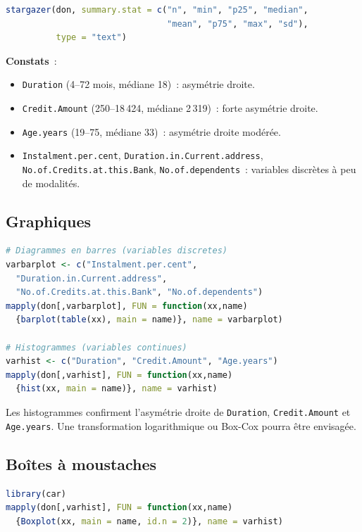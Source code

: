 \documentclass[a4paper,11pt]{article}
\theoremstyle{definition}
\theoremstyle{remark}
\begin{document}
\begin{lstlisting}[language=R]
stargazer(don, summary.stat = c("n", "min", "p25", "median",
                                "mean", "p75", "max", "sd"),
          type = "text")
\end{lstlisting}

\textbf{Constats}~:
\begin{itemize}
  \item \texttt{Duration} (4--72 mois, médiane 18)~: asymétrie droite.
  \item \texttt{Credit.Amount} (250--18\,424, médiane 2\,319)~:
    forte asymétrie droite.
  \item \texttt{Age.years} (19--75, médiane 33)~: asymétrie droite
    modérée.
  \item \texttt{Instalment.per.cent}, \texttt{Duration.in.Current.address},
    \texttt{No.of.Credits.at.this.Bank}, \texttt{No.of.dependents}~:
    variables discrètes à peu de modalités.
\end{itemize}

\subsection{Graphiques}

\begin{lstlisting}[language=R]
# Diagrammes en barres (variables discretes)
varbarplot <- c("Instalment.per.cent",
  "Duration.in.Current.address",
  "No.of.Credits.at.this.Bank", "No.of.dependents")
mapply(don[,varbarplot], FUN = function(xx,name)
  {barplot(table(xx), main = name)}, name = varbarplot)

# Histogrammes (variables continues)
varhist <- c("Duration", "Credit.Amount", "Age.years")
mapply(don[,varhist], FUN = function(xx,name)
  {hist(xx, main = name)}, name = varhist)
\end{lstlisting}

Les histogrammes confirment l'asymétrie droite de \texttt{Duration},
\texttt{Credit.Amount} et \texttt{Age.years}. Une transformation
logarithmique ou Box-Cox pourra être envisagée.

\subsection{Boîtes à moustaches}

\begin{lstlisting}[language=R]
library(car)
mapply(don[,varhist], FUN = function(xx,name)
  {Boxplot(xx, main = name, id.n = 2)}, name = varhist)
\end{lstlisting}
\end{document}
